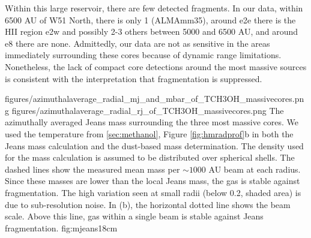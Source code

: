 \documentclass[twocolumn]{aastex61}
\begin{document}


Within this large reservoir, there are few detected fragments.  In our data,
within 6500 AU of W51 North, there is only 1 (ALMAmm35), around e2e there is
the HII region e2w and possibly 2-3 others between 5000 and 6500 AU, and around
e8 there are none.  Admittedly, our data are not as sensitive in the areas
immediately surrounding these cores because of dynamic range limitations.
Nonetheless, the lack of compact core detections around the most massive
sources is consistent with the interpretation that fragmentation is suppressed.



\FigureTwo
{figures/azimuthalaverage_radial_mj_and_mbar_of_TCH3OH_massivecores.png}
{figures/azimuthalaverage_radial_rj_of_TCH3OH_massivecores.png}
{The azimuthally averaged Jeans mass surrounding the
three most massive cores.  We used the \methanol temperature from
\ref{sec:methanol}, Figure \ref{fig:hmradprof}b in both the Jeans mass
calculation and the dust-based mass determination.
The density used for the mass calculation is assumed to be distributed
over spherical shells.  The dashed lines show the measured mean mass per
$\sim1000$ AU beam at each radius.  Since these masses are lower than
the local Jeans mass, the gas is stable against fragmentation.
The high variation seen at small radii (below 0.2\arcsec, shaded area) is due
to sub-resolution noise.
In (b), the horizontal dotted line shows the beam scale. Above this line,
gas within a single beam is stable against Jeans fragmentation.
}
{fig:mjeans}{1}{8cm}
\end{document}
